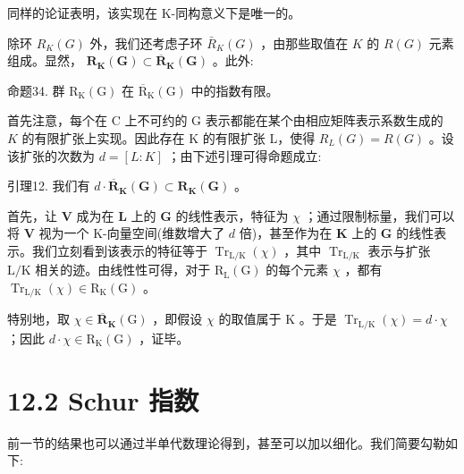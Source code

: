 \documentclass[10pt]{article}
\begin{document}
同样的论证表明，该实现在 K-同构意义下是唯一的。

除环 \({R}_{K}\left( G\right)\) 外，我们还考虑子环 \({\bar{R}}_{K}\left( G\right)\) ，由那些取值在 \(K\) 的 \(R\left( G\right)\) 元素组成。显然， \({\mathbf{R}}_{\mathbf{K}}\left( \mathbf{G}\right)  \subset  {\overline{\mathbf{R}}}_{\mathbf{K}}\left( \mathbf{G}\right)\) 。此外:

命题34. 群 \({\mathrm{R}}_{\mathrm{K}}\left( \mathrm{G}\right)\) 在 \({\overline{\mathrm{R}}}_{\mathrm{K}}\left( \mathrm{G}\right)\) 中的指数有限。

首先注意，每个在 C 上不可约的 G 表示都能在某个由相应矩阵表示系数生成的 \(K\) 的有限扩张上实现。因此存在 K 的有限扩张 L，使得 \({R}_{L}\left( G\right)  = R\left( G\right)\) 。设该扩张的次数为 \(d = \left\lbrack  {L : K}\right\rbrack\) ；由下述引理可得命题成立:

引理12. 我们有 \(d \cdot  {\overline{\mathbf{R}}}_{\mathbf{K}}\left( \mathbf{G}\right)  \subset  {\mathbf{R}}_{\mathbf{K}}\left( \mathbf{G}\right)\) 。

首先，让 \(\mathbf{V}\) 成为在 \(\mathbf{L}\) 上的 \(\mathbf{G}\) 的线性表示，特征为 \(\chi\) ；通过限制标量，我们可以将 \(\mathbf{V}\) 视为一个 K-向量空间(维数增大了 \(d\) 倍)，甚至作为在 \(\mathbf{K}\) 上的 \(\mathbf{G}\) 的线性表示。我们立刻看到该表示的特征等于 \({\operatorname{Tr}}_{\mathrm{L}/\mathrm{K}}\left( \chi \right)\) ，其中 \({\operatorname{Tr}}_{\mathrm{L}/\mathrm{K}}\) 表示与扩张 \(\mathrm{L}/\mathrm{K}\) 相关的迹。由线性性可得，对于 \({\mathrm{R}}_{\mathrm{L}}\left( \mathrm{G}\right)\) 的每个元素 \(\chi\) ，都有 \({\operatorname{Tr}}_{\mathrm{L}/\mathrm{K}}\left( \chi \right)  \in  {\mathrm{R}}_{\mathrm{K}}\left( \mathrm{G}\right)\) 。

特别地，取 \(\chi  \in  {\overline{\mathbf{R}}}_{\mathbf{K}}\left( \mathrm{G}\right)\) ，即假设 \(\chi\) 的取值属于 \(\mathrm{K}\) 。于是 \({\operatorname{Tr}}_{\mathrm{L}/\mathrm{K}}\left( \chi \right)  = d \cdot  \chi\) ；因此 \(d \cdot  \chi  \in  {\mathrm{R}}_{\mathrm{K}}\left( \mathrm{G}\right)\) ，证毕。

\section*{12.2 Schur 指数}

前一节的结果也可以通过半单代数理论得到，甚至可以加以细化。我们简要勾勒如下:
\end{document}
